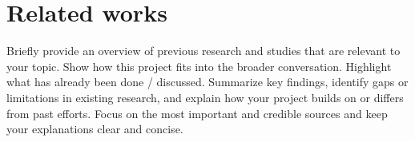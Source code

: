\section{Related works}
Briefly provide an overview of previous research and studies that are relevant to your topic. Show how this project fits into the broader conversation. Highlight what has already been done / discussed. Summarize key findings, identify gaps or limitations in existing research, and explain how your project builds on or differs from past efforts. Focus on the most important and credible sources and keep your explanations clear and concise.